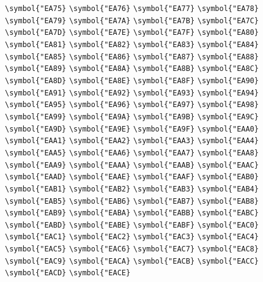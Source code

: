\documentclass{ctexbook}
\begin{document}
 \verb|\symbol{"EA75}|  \verb|\symbol{"EA76}|  \verb|\symbol{"EA77}|  \verb|\symbol{"EA78}|  \verb|\symbol{"EA79}|  \verb|\symbol{"EA7A}|  \verb|\symbol{"EA7B}|  \verb|\symbol{"EA7C}|  \verb|\symbol{"EA7D}|  \verb|\symbol{"EA7E}|  \verb|\symbol{"EA7F}|  \verb|\symbol{"EA80}|  \verb|\symbol{"EA81}|  \verb|\symbol{"EA82}|  \verb|\symbol{"EA83}|  \verb|\symbol{"EA84}|  \verb|\symbol{"EA85}|  \verb|\symbol{"EA86}|  \verb|\symbol{"EA87}|  \verb|\symbol{"EA88}|  \verb|\symbol{"EA89}|  \verb|\symbol{"EA8A}|  \verb|\symbol{"EA8B}|  \verb|\symbol{"EA8C}|  \verb|\symbol{"EA8D}|  \verb|\symbol{"EA8E}|  \verb|\symbol{"EA8F}|  \verb|\symbol{"EA90}|  \verb|\symbol{"EA91}|  \verb|\symbol{"EA92}|  \verb|\symbol{"EA93}|  \verb|\symbol{"EA94}|  \verb|\symbol{"EA95}|  \verb|\symbol{"EA96}|  \verb|\symbol{"EA97}|  \verb|\symbol{"EA98}|  \verb|\symbol{"EA99}|  \verb|\symbol{"EA9A}|  \verb|\symbol{"EA9B}|  \verb|\symbol{"EA9C}|  \verb|\symbol{"EA9D}|  \verb|\symbol{"EA9E}|  \verb|\symbol{"EA9F}|  \verb|\symbol{"EAA0}|  \verb|\symbol{"EAA1}|  \verb|\symbol{"EAA2}|  \verb|\symbol{"EAA3}|  \verb|\symbol{"EAA4}|  \verb|\symbol{"EAA5}|  \verb|\symbol{"EAA6}|  \verb|\symbol{"EAA7}|  \verb|\symbol{"EAA8}|  \verb|\symbol{"EAA9}|  \verb|\symbol{"EAAA}|  \verb|\symbol{"EAAB}|  \verb|\symbol{"EAAC}|  \verb|\symbol{"EAAD}|  \verb|\symbol{"EAAE}|  \verb|\symbol{"EAAF}|  \verb|\symbol{"EAB0}|  \verb|\symbol{"EAB1}|  \verb|\symbol{"EAB2}|  \verb|\symbol{"EAB3}|  \verb|\symbol{"EAB4}|  \verb|\symbol{"EAB5}|  \verb|\symbol{"EAB6}|  \verb|\symbol{"EAB7}|  \verb|\symbol{"EAB8}|  \verb|\symbol{"EAB9}|  \verb|\symbol{"EABA}|  \verb|\symbol{"EABB}|  \verb|\symbol{"EABC}|  \verb|\symbol{"EABD}|  \verb|\symbol{"EABE}|  \verb|\symbol{"EABF}|  \verb|\symbol{"EAC0}|  \verb|\symbol{"EAC1}|  \verb|\symbol{"EAC2}|  \verb|\symbol{"EAC3}|  \verb|\symbol{"EAC4}|  \verb|\symbol{"EAC5}|  \verb|\symbol{"EAC6}|  \verb|\symbol{"EAC7}|  \verb|\symbol{"EAC8}|  \verb|\symbol{"EAC9}|  \verb|\symbol{"EACA}|  \verb|\symbol{"EACB}|  \verb|\symbol{"EACC}|  \verb|\symbol{"EACD}|  \verb|\symbol{"EACE}| 
\end{document}
